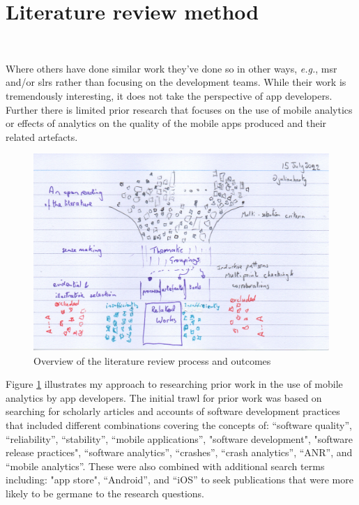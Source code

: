 \section{Literature review method}~\label{rw-tactics-and-topics-for-this-chapter}

Where others have done similar work they've done so in other ways, \emph{e.g.}, \Gls{msr} and/or \Glspl{slr} rather than focusing on the development teams. While their work is tremendously interesting, it does not take the perspective of app developers. Further there is limited prior research that focuses on the use of mobile analytics or effects of analytics on the quality of the mobile apps produced and their related artefacts. 


\begin{figure}
    \centering
    \includegraphics[width=\textwidth]{images/rough-sketches/literature-review-overview.jpeg}
    \caption{Overview of the literature review process and outcomes}
    \label{fig:literature-review-overview}
\end{figure}

Figure \ref{fig:literature-review-overview} illustrates my approach to researching prior work in the use of mobile analytics by app developers. 
%
The initial trawl for prior work was based on searching for scholarly articles and accounts of software development practices that included different combinations covering the concepts of: ``software quality'', ``reliability'', ``stability'', ``mobile applications'', "software development", "software release practices", ``software analytics'', ``crashes'', ``crash analytics'', ``ANR'', and ``mobile analytics''. These were also combined with additional search terms including: "app store", ``Android'', and ``iOS'' to seek publications that were more likely to be germane to the research questions.  

